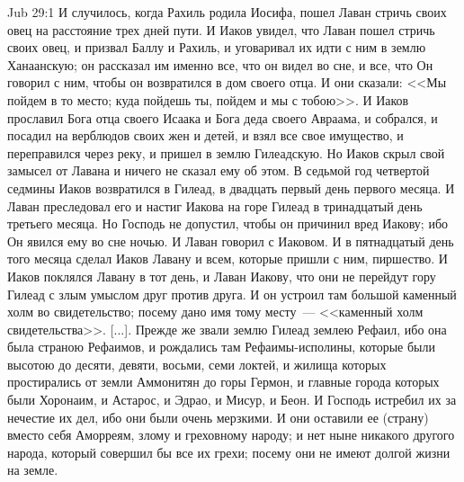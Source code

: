 \vs Jub 29:1
И случилось, когда Рахиль родила Иосифа, пошел
Лаван стричь своих овец на расстояние трех дней
пути. И Иаков увидел, что Лаван пошел стричь своих
овец, и призвал Баллу и Рахиль, и уговаривал их
идти с ним в землю Ханаанскую; он рассказал им
именно все, что он видел во сне, и все, что Он
говорил с ним, чтобы он возвратился в дом своего
отца. И они сказали: <<Мы пойдем в то место; куда пойдешь
ты, пойдем и мы с тобою>>. И Иаков прославил
Бога отца своего Исаака и Бога деда своего
Авраама, и собрался, и посадил на верблюдов своих
жен и детей, и взял все свое имущество, и
переправился через реку, и пришел в землю
Гилеадскую. Но Иаков скрыл свой замысел от Лавана
и ничего не сказал ему об этом. В седьмой год
четвертой седмины Иаков возвратился в Гилеад, в
двадцать первый день первого месяца. И Лаван
преследовал его и настиг Иакова на горе Гилеад в
тринадцатый день третьего месяца. Но Господь не
допустил, чтобы он причинил вред Иакову; ибо Он
явился ему во сне ночью. И Лаван говорил с
Иаковом. И в пятнадцатый день того месяца сделал
Иаков Лавану и всем, которые пришли с ним,
пиршество. И Иаков поклялся Лавану в тот день, и
Лаван Иакову, что они не перейдут гору Гилеад с
злым умыслом друг против друга. И он устроил там
большой каменный холм во свидетельство; посему
дано имя тому месту~--- <<каменный холм
свидетельства>>. [...]. Прежде же звали землю
Гилеад землею Рефаил, ибо она была страною
Рефаимов, и рождались там Рефаимы-исполины,
которые были высотою до десяти, девяти, восьми,
семи локтей, и жилища которых простирались от
земли Аммонитян до горы Гермон, и главные города
которых были Хоронаим, и Астарос, и Эдрао, и Мисур,
и Беон. И Господь истребил их за нечестие их дел,
ибо они были очень мерзкими. И они оставили ее
(страну) вместо себя Аморреям, злому и греховному
народу; и нет ныне никакого другого народа, который
совершил бы все их грехи; посему они не имеют
долгой жизни на земле.

